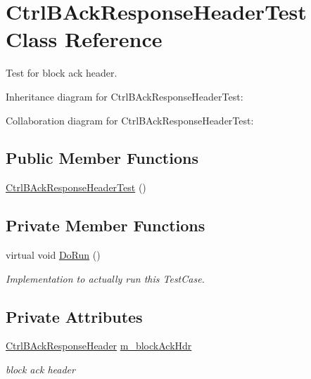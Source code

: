 \hypertarget{classCtrlBAckResponseHeaderTest}{}\section{Ctrl\+B\+Ack\+Response\+Header\+Test Class Reference}
\label{classCtrlBAckResponseHeaderTest}


Test for block ack header.  




Inheritance diagram for Ctrl\+B\+Ack\+Response\+Header\+Test\+:


Collaboration diagram for Ctrl\+B\+Ack\+Response\+Header\+Test\+:
\subsection*{Public Member Functions}
\begin{DoxyCompactItemize}
\item 
\hyperlink{classCtrlBAckResponseHeaderTest_a8855c2a1a596d1f8fa63497fb603df01}{Ctrl\+B\+Ack\+Response\+Header\+Test} ()
\end{DoxyCompactItemize}
\subsection*{Private Member Functions}
\begin{DoxyCompactItemize}
\item 
virtual void \hyperlink{classCtrlBAckResponseHeaderTest_a19cf1ac31281254d487041e4c5dcdc50}{Do\+Run} ()
\begin{DoxyCompactList}\small\item\em Implementation to actually run this Test\+Case. \end{DoxyCompactList}\end{DoxyCompactItemize}
\subsection*{Private Attributes}
\begin{DoxyCompactItemize}
\item 
\hyperlink{classns3_1_1CtrlBAckResponseHeader}{Ctrl\+B\+Ack\+Response\+Header} \hyperlink{classCtrlBAckResponseHeaderTest_a1319fff4c2f7b2dcb378f52026174c84}{m\+\_\+block\+Ack\+Hdr}
\begin{DoxyCompactList}\small\item\em block ack header \end{DoxyCompactList}\end{DoxyCompactItemize}
